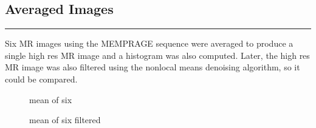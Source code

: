 \subsection*{Averaged Images}
	\vspace*{-0.5cm}\rule{5cm}{0.1mm}
	
	\Large{Six MR images using the MEMPRAGE sequence were averaged to produce a single high res MR image and a histogram was also computed. Later, the high res MR image was also filtered using the nonlocal means denoising algorithm, so it could be compared.} 
	
    \begin{figure}[!h]
        \centering
            \begin{minipage}{0.17\linewidth}
                
            \end{minipage}
            \begin{minipage}{0.17\linewidth}
                
        \end{minipage}\hspace{0.5cm}
        \begin{minipage}{0.17\linewidth}
                
            \end{minipage}
        \begin{minipage}{0.17\linewidth}
                
        \end{minipage}
        \vspace{-0.4cm}
        
        \begin{minipage}{0.17\linewidth}
                \centering \hspace{-15cm} mean of six
            \end{minipage}
        \begin{minipage}{0.17\linewidth}
                \centering mean of six filtered
            \end{minipage}
    \end{figure}
        

